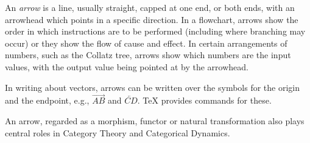 \documentclass[12pt]{article}
\begin{document}
An {\em arrow} is a line, usually straight, capped at one end, or both ends, with an arrowhead which points in a specific direction. In a flowchart, arrows show the order in which instructions are to be performed (including where branching may occur) or they show the flow of cause and effect. In certain arrangements of numbers, such as the Collatz tree, arrows show which numbers are the input values, with the output value being pointed at by the arrowhead.

In writing about vectors, arrows can be written over the symbols for the origin and the endpoint, e.g., $\overrightarrow{AB}$ and $\overleftarrow{CD}$. \TeX{} provides commands for these.

An arrow, regarded as a morphism, functor or natural transformation also plays central roles
in Category Theory and Categorical Dynamics. 
\end{document}
